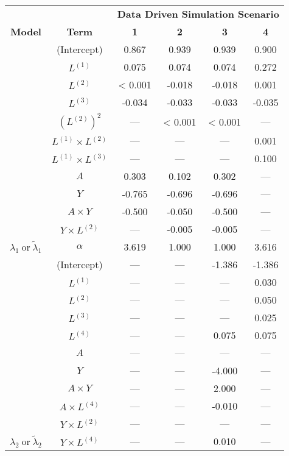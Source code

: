 \begin{sidewaystable}
\begin{minipage}[t]{0.5\textwidth}
\begin{tabular}[t]{>{}ccccc>{}c}
\hline
\multicolumn{1}{c}{\textbf{ }} & \multicolumn{1}{c}{\textbf{ }} & \multicolumn{4}{c}{\textbf{Data Driven Simulation Scenario}} \\
\cmidrule{3-6}
\textbf{Model} & \textbf{Term} & \textbf{1} & \textbf{2} & \textbf{3} & \textbf{4}\\
\hline
 & (Intercept) & 0.867 & 0.939 & 0.939 & 0.900\\
\cmidrule{2-6}
 & $L^{(1)}$ & 0.075 & 0.074 & 0.074 & 0.272\\
\cmidrule{2-6}
 & $L^{(2)}$ & < 0.001 & -0.018 & -0.018 & 0.001\\
\cmidrule{2-6}
 & $L^{(3)}$ & -0.034 & -0.033 & -0.033 & -0.035\\
\cmidrule{2-6}
 & $(L^{(2)})^2$ & --- & < 0.001 & < 0.001 & ---\\
\cmidrule{2-6}
 & $L^{(1)} \times L^{(2)}$ & --- & --- & --- & 0.001\\
\cmidrule{2-6}
 & $L^{(1)} \times L^{(3)}$ & --- & --- & --- & 0.100\\
\cmidrule{2-6}
 & $A$ & 0.303 & 0.102 & 0.302 & ---\\
\cmidrule{2-6}
 & $Y$ & -0.765 & -0.696 & -0.696 & ---\\
\cmidrule{2-6}
 & $A\times Y$ & -0.500 & -0.050 & -0.500 & ---\\
\cmidrule{2-6}
 & $Y \times L^{(2)}$ & --- & -0.005 & -0.005 & ---\\
\cmidrule{2-6}
\multirow{-12}{*}{\centering\arraybackslash $\lambda_1~\text{or}~\tilde\lambda_1$} & $\alpha$ & 3.619 & 1.000 & 1.000 & 3.616\\
\cmidrule{1-6}
 & (Intercept) & --- & --- & -1.386 & -1.386\\
\cmidrule{2-6}
 & $L^{(1)}$ & --- & --- & --- & 0.030\\
\cmidrule{2-6}
 & $L^{(2)}$ & --- & --- & --- & 0.050\\
\cmidrule{2-6}
 & $L^{(3)}$ & --- & --- & --- & 0.025\\
\cmidrule{2-6}
 & $L^{(4)}$ & --- & --- & 0.075 & 0.075\\
\cmidrule{2-6}
 & $A$ & --- & --- & --- & ---\\
\cmidrule{2-6}
 & $Y$ & --- & --- & -4.000 & ---\\
\cmidrule{2-6}
 & $A\times Y$ & --- & --- & 2.000 & ---\\
\cmidrule{2-6}
 & $A \times L^{(4)}$ & --- & --- & -0.010 & ---\\
\cmidrule{2-6}
 & $Y \times L^{(2)}$ & --- & --- & --- & ---\\
\cmidrule{2-6}
\multirow{-11}{*}{\centering\arraybackslash $\lambda_2~\text{or}~\tilde\lambda_2$} & $Y \times L^{(4)}$ & --- & --- & 0.010 & ---\\
\hline
\end{tabular}
\end{minipage}
\end{sidewaystable}
